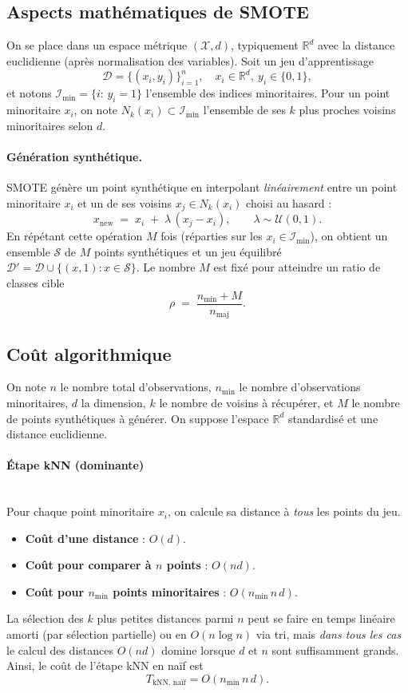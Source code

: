 \documentclass{article}
\begin{document}
\subsection{Aspects mathématiques de SMOTE}

On se place dans un espace métrique $(\mathcal{X}, d)$, typiquement $\mathbb{R}^d$ avec la distance euclidienne (après normalisation des variables). Soit un jeu d'apprentissage
\[
\mathcal{D}=\{(x_i,y_i)\}_{i=1}^n,\quad x_i\in\mathbb{R}^d,\ y_i\in\{0,1\},
\]
et notons $\mathcal{I}_{\text{min}}=\{i:\,y_i=1\}$ l’ensemble des indices minoritaires. Pour un point minoritaire $x_i$, on note $N_k(x_i)\subset\mathcal{I}_{\text{min}}$ l’ensemble de ses $k$ plus proches voisins minoritaires selon $d$.

\paragraph{Génération synthétique.} SMOTE génère un point synthétique en interpolant \emph{linéairement} entre un point minoritaire $x_i$ et un de ses voisins $x_j\in N_k(x_i)$ choisi au hasard :
\[
x_{\text{new}} \;=\; x_i \;+\; \lambda\,(x_j - x_i),
\qquad \lambda \sim \mathcal{U}(0,1).
\]
En répétant cette opération $M$ fois (réparties sur les $x_i\in\mathcal{I}_{\text{min}}$), on obtient un ensemble $\mathcal{S}$ de $M$ points synthétiques et un jeu équilibré $\mathcal{D}'=\mathcal{D}\cup\{(x,1):x\in\mathcal{S}\}$. Le nombre $M$ est fixé pour atteindre un ratio de classes cible
\[
\rho \;=\; \frac{n_{\text{min}} + M}{n_{\text{maj}}}.
\]

\subsection{Coût algorithmique}

On note $n$ le nombre total d'observations, $n_{\text{min}}$ le nombre d'observations minoritaires,
$d$ la dimension, $k$ le nombre de voisins à récupérer, et $M$ le nombre de points synthétiques à générer.
On suppose l’espace $\mathbb{R}^d$ standardisé et une distance euclidienne.

\paragraph{Étape kNN (dominante)} \cite{sklearnNeighbors}
\\
Pour chaque point minoritaire $x_i$, on calcule sa distance à \emph{tous} les points du jeu.
\begin{itemize}
  \item \textbf{Coût d'une distance} : $O(d)$.
  \item \textbf{Coût pour comparer à $n$ points} : $O(nd)$.
  \item \textbf{Coût pour $n_{\text{min}}$ points minoritaires} : $O(n_{\text{min}}\,n\,d)$.
\end{itemize}
La sélection des $k$ plus petites distances parmi $n$ peut se faire en temps linéaire amorti
(par sélection partielle) ou en $O(n\log n)$ via tri, mais \emph{dans tous les cas} le calcul des distances
$O(nd)$ domine lorsque $d$ et $n$ sont suffisamment grands. Ainsi, le coût de l’étape kNN en naïf est
\[
T_{\text{kNN, naïf}} = O(n_{\text{min}}\,n\,d).
\]
\end{document}
